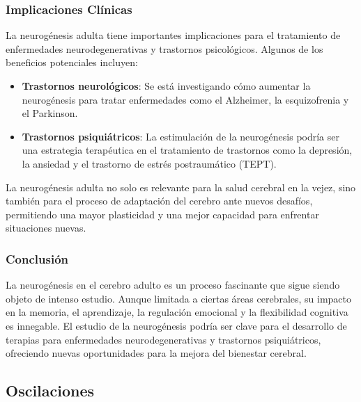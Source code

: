 \documentclass[12pt, letterpaper]{article}
\begin{document}
\subsubsection{Implicaciones Clínicas}
La neurogénesis adulta tiene importantes implicaciones para el tratamiento de enfermedades neurodegenerativas y trastornos psicológicos. Algunos de los beneficios potenciales incluyen:

\begin{itemize}
    \item \textbf{Trastornos neurológicos}: Se está investigando cómo aumentar la neurogénesis para tratar enfermedades como el Alzheimer, la esquizofrenia y el Parkinson.
    \item \textbf{Trastornos psiquiátricos}: La estimulación de la neurogénesis podría ser una estrategia terapéutica en el tratamiento de trastornos como la depresión, la ansiedad y el trastorno de estrés postraumático (TEPT).
\end{itemize}

La neurogénesis adulta no solo es relevante para la salud cerebral en la vejez, sino también para el proceso de adaptación del cerebro ante nuevos desafíos, permitiendo una mayor plasticidad y una mejor capacidad para enfrentar situaciones nuevas.

\subsubsection{Conclusión}
La neurogénesis en el cerebro adulto es un proceso fascinante que sigue siendo objeto de intenso estudio. Aunque limitada a ciertas áreas cerebrales, su impacto en la memoria, el aprendizaje, la regulación emocional y la flexibilidad cognitiva es innegable. El estudio de la neurogénesis podría ser clave para el desarrollo de terapias para enfermedades neurodegenerativas y trastornos psiquiátricos, ofreciendo nuevas oportunidades para la mejora del bienestar cerebral.


\subsection{Oscilaciones}
\end{document}
